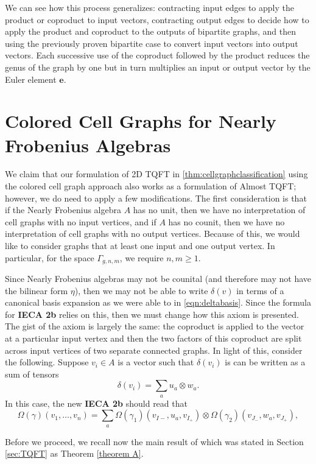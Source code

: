 \documentclass{amsart}
\newcommand{\be}{\begin{equation}}
\newcommand{\ee}{\end{equation}}
\newcommand{\tensor}{\otimes}
\newcommand{\eul}{\mathbf{e}}
\theoremstyle{definition}
\begin{document}
\noindent We can see how this process generalizes: contracting input edges to apply the product or coproduct to input vectors, contracting output edges to decide how to apply the product and coproduct to the outputs of bipartite graphs, and then using the previously proven bipartite case to convert input vectors into output vectors. Each successive use of the coproduct followed by the product reduces the genus of the graph by one but in turn multiplies an input or output vector by the Euler element $\eul$.

\section{Colored Cell Graphs for Nearly Frobenius Algebras}\label{SecInfiniteCCG}
We claim that our formulation of 2D TQFT in \ref{thm:cellgraphclassification} using the colored cell graph approach also works as a formulation of Almost TQFT; however, we do need to apply a few modifications. The first consideration is that if the Nearly Frobenius algebra $A$ has no unit, then we have no interpretation of cell graphs with no input vertices, and if $A$ has no counit, then we have no interpretation of cell graphs with no output vertices. Because of this, we would like to consider graphs that at least one input and one output vertex. In particular, for the space $\Gamma_{g,n,m}$, we require $n,m\geq 1$.


\noindent Since Nearly Frobenius algebras may not be counital (and therefore may not have the bilinear form $\eta$), then we may not be able to write $\delta(v)$ in terms of a canonical basis expansion as we were able to in \ref{eqn:deltabasis}. Since the formula for \textbf{IECA 2b} relies on this, then we must change how this axiom is presented. The gist of the axiom is largely the same: the coproduct is applied to the vector at a particular input vertex and then the two factors of this coproduct are split across input vertices of two separate connected graphs. In light of this, consider the following. Suppose $v_i\in A$ is a vector such that $\delta(v_i)$ is can be written as a sum of tensors 
\be
\delta(v_i)=\sum_a u_a\tensor w_a.
\ee
\noindent In this case, the new \textbf{IECA 2b} should read that 
\be
\Omega(\gamma)(v_1,\ldots,v_n)=\sum_a \Omega(\gamma_1)(v_{I-},u_a,v_{I_+})\tensor \Omega(\gamma_2)(v_{J_-},w_a,v_{J_+}),
\ee

Before we proceed, we recall now the main result of \cite{DaDu} which was stated in Section \ref{sec:TQFT} as Theorem \ref{theorem A}.
\end{document}
